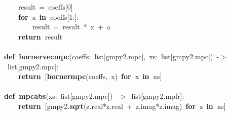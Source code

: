 \documentclass{article}\usepackage[]{graphicx}\usepackage[dvipsnames,table]{xcolor}
\makeatletter
\newcommand{\hlnum}[1]{\textcolor[rgb]{0.686,0.059,0.569}{#1}}%
\newcommand{\hlopt}[1]{\textcolor[rgb]{0,0,0}{#1}}%
\newcommand{\hldef}[1]{\textcolor[rgb]{0.345,0.345,0.345}{#1}}%
\newcommand{\hlkwa}[1]{\textcolor[rgb]{0.161,0.373,0.58}{\textbf{#1}}}%
\newcommand{\hlkwb}[1]{\textcolor[rgb]{0.69,0.353,0.396}{#1}}%
\newcommand{\hlkwd}[1]{\textcolor[rgb]{0.737,0.353,0.396}{\textbf{#1}}}%
\newenvironment{kframe}{%
 \def\at@end@of@kframe{}%
 \ifinner\ifhmode%
  \def\at@end@of@kframe{\end{minipage}}%
  \begin{minipage}{\columnwidth}%
 \fi\fi%
 \def\FrameCommand##1{\hskip\@totalleftmargin \hskip-\fboxsep
 \colorbox{shadecolor}{##1}\hskip-\fboxsep
     \hskip-\linewidth \hskip-\@totalleftmargin \hskip\columnwidth}%
 \MakeFramed {\advance\hsize-\width
   \@totalleftmargin\z@ \linewidth\hsize
   \@setminipage}}%
 {\par\unskip\endMakeFramed%
 \at@end@of@kframe}
\newenvironment{knitrout}{}{} %
\makeatother
\begin{document}
\begin{center}
\begin{minipage}[m]{15cm}
\begin{knitrout}
\begin{kframe}
\hldef{}\hldef{\ \ \ \ }\hldef{result\ }\hlopt{=\ }\hldef{coeffs}\hlopt{{[}}\hldef{}\hlnum{0}\hldef{}\hlopt{{]}}\hspace*{\fill}\\
\hldef{}\hldef{\ \ \ \ }\hldef{}\hlkwa{for\ }\hldef{a\ }\hlkwa{in\ }\hldef{coeffs}\hlopt{{[}}\hldef{}\hlnum{1}\hldef{}\hlopt{:{]}:}\hspace*{\fill}\\
\hldef{}\hldef{\ \ \ \ \ \ \ \ }\hldef{result\ }\hlopt{=\ }\hldef{result\ }\hlopt{{*}\ }\hldef{x\ }\hlopt{+\ }\hldef{a}\hspace*{\fill}\\
\hldef{}\hldef{\ \ \ \ }\hldef{}\hlkwa{return\ }\hldef{result}\hspace*{\fill}\\
\hldef{}\hspace*{\fill}\\
\hldef{}\hlkwa{def\ }\hldef{}\hlkwd{horner\textunderscore vec\textunderscore mpc}\hldef{}\hlopt{(}\hldef{coeffs}\hlopt{:\ }\hldef{}\hlkwb{list}\hldef{}\hlopt{{[}}\hldef{gmpy2}\hlopt{.}\hldef{mpc}\hlopt{{]},\ }\hldef{xs}\hlopt{:\ }\hldef{}\hlkwb{list}\hldef{}\hlopt{{[}}\hldef{gmpy2}\hlopt{.}\hldef{mpc}\hlopt{{]})\ {-}$>$\ }\hldef{}\hlkwb{list}\hldef{}\hlopt{{[}}\hldef{gmpy2}\hlopt{.}\hldef{mpc}\hlopt{{]}:}\hspace*{\fill}\\
\hldef{}\hldef{\ \ \ \ }\hldef{}\hlkwa{return\ }\hldef{}\hlopt{{[}}\hldef{}\hlkwd{horner\textunderscore mpc}\hldef{}\hlopt{(}\hldef{coeffs}\hlopt{,\ }\hldef{x}\hlopt{)\ }\hldef{}\hlkwa{for\ }\hldef{x\ }\hlkwa{in\ }\hldef{xs}\hlopt{{]}}\hspace*{\fill}\\
\hldef{}\hspace*{\fill}\\
\hldef{}\hlkwa{def\ }\hldef{}\hlkwd{mpc\textunderscore abs}\hldef{}\hlopt{(}\hldef{xs}\hlopt{:\ }\hldef{}\hlkwb{list}\hldef{}\hlopt{{[}}\hldef{gmpy2}\hlopt{.}\hldef{mpc}\hlopt{{]})\ {-}$>$\ }\hldef{}\hlkwb{list}\hldef{}\hlopt{{[}}\hldef{gmpy2}\hlopt{.}\hldef{mpfr}\hlopt{{]}:}\hspace*{\fill}\\
\hldef{}\hldef{\ \ \ \ }\hldef{}\hlkwa{return\ }\hldef{}\hlopt{{[}}\hldef{gmpy2}\hlopt{.}\hldef{}\hlkwd{sqrt}\hldef{}\hlopt{(}\hldef{z}\hlopt{.}\hldef{real}\hlopt{{*}}\hldef{z}\hlopt{.}\hldef{real\ }\hlopt{+\ }\hldef{z}\hlopt{.}\hldef{imag}\hlopt{{*}}\hldef{z}\hlopt{.}\hldef{imag}\hlopt{)\ }\hldef{}\hlkwa{for\ }\hldef{z\ }\hlkwa{in\ }\hldef{xs}\hlopt{{]}}\hspace*{\fill}\\

\end{kframe}
\end{knitrout}
\end{minipage}
\end{center}
\end{document}
